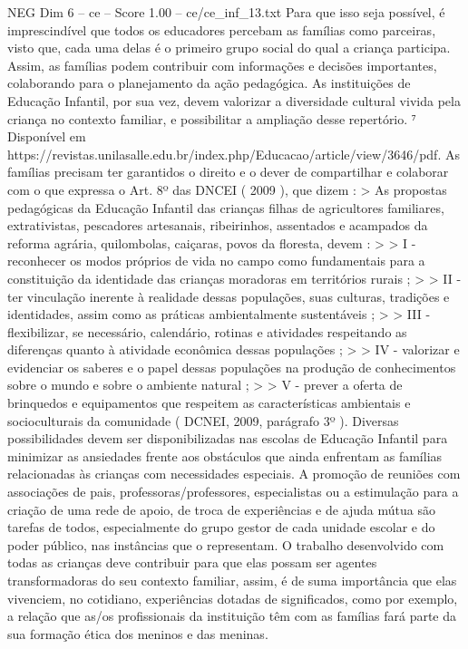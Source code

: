 \begin{textsample}{NEG Dim 6 – ce – Score 1.00 – ce/ce\_inf\_13.txt}
Para que isso seja possível, é imprescindível que todos os educadores percebam as famílias como parceiras, visto que, cada uma delas é o primeiro grupo social do qual a criança participa.
Assim, as famílias podem contribuir com informações e decisões importantes, colaborando para o planejamento da ação pedagógica.
As instituições de Educação Infantil, por sua vez, devem valorizar a diversidade cultural vivida pela criança no contexto familiar, e possibilitar a ampliação desse repertório. ⁷ Disponível em https://revistas.unilasalle.edu.br/index.php/Educacao/article/view/3646/pdf.
As famílias precisam ter garantidos o direito e o dever de compartilhar e colaborar com o que expressa o Art. 8º das DNCEI ( 2009 ), que dizem : > As propostas pedagógicas da Educação Infantil das crianças filhas de agricultores familiares, extrativistas, pescadores artesanais, ribeirinhos, assentados e acampados da reforma agrária, quilombolas, caiçaras, povos da floresta, devem : > > I - reconhecer os modos próprios de vida no campo como fundamentais para a constituição da identidade das crianças moradoras em territórios rurais ; > > II - ter vinculação inerente à realidade dessas populações, suas culturas, tradições e identidades, assim como as práticas ambientalmente sustentáveis ; > > III - flexibilizar, se necessário, calendário, rotinas e atividades respeitando as diferenças quanto à atividade econômica dessas populações ; > > IV - valorizar e evidenciar os saberes e o papel dessas populações na produção de conhecimentos sobre o mundo e sobre o ambiente natural ; > > V - prever a oferta de brinquedos e equipamentos que respeitem as características ambientais e socioculturais da comunidade ( DCNEI, 2009, parágrafo 3º ).
Diversas possibilidades devem ser disponibilizadas nas escolas de Educação Infantil para minimizar as ansiedades frente aos obstáculos que ainda enfrentam as famílias relacionadas às crianças com necessidades especiais.
A promoção de reuniões com associações de pais, professoras/professores, especialistas ou a estimulação para a criação de uma rede de apoio, de troca de experiências e de ajuda mútua são tarefas de todos, especialmente do grupo gestor de cada unidade escolar e do poder público, nas instâncias que o representam.
O trabalho desenvolvido com todas as crianças deve contribuir para que elas possam ser agentes transformadoras do seu contexto familiar, assim, é de suma importância que elas vivenciem, no cotidiano, experiências dotadas de significados, como por exemplo, a relação que as/os profissionais da instituição têm com as famílias fará parte da sua formação ética dos meninos e das meninas.

\end{textsample}
